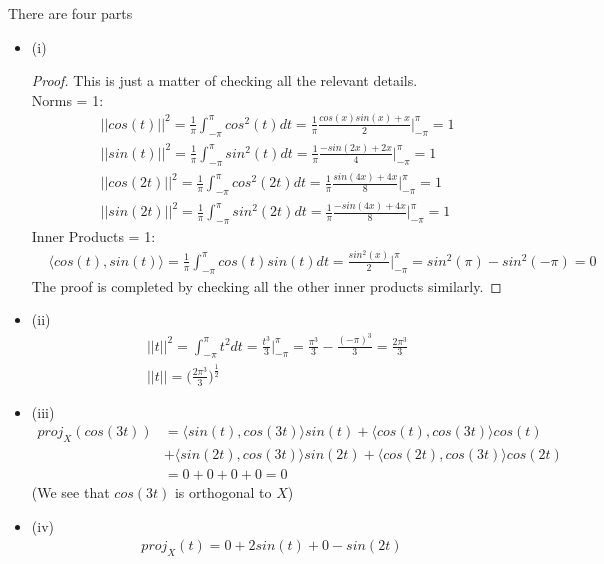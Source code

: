 \documentclass[12pt]{article}
\newenvironment{problem}[2][Problem]{\begin{trivlist}
\item[\hskip \labelsep {\bfseries #1}\hskip \labelsep {\bfseries #2.}]}{\end{trivlist}}
\theoremstyle{definition}
\theoremstyle{definition}
\theoremstyle{definition}
\theoremstyle{definition}
\begin{document}
\begin{problem}{3.8} There are four parts
\begin{itemize}
\item (i)
\begin{proof}
This is just a matter of checking all the relevant details. \\
Norms = 1:
\begin{align*}
&||cos(t)||^2 = \frac{1}{\pi} \int_{-\pi}^{\pi} cos^2(t) dt = \frac{1}{\pi}\frac{cos(x)sin(x) + x}{2} \big\vert^{\pi}_{-\pi} = 1 \\
&||sin(t)||^2 = \frac{1}{\pi} \int_{-\pi}^{\pi} sin^2(t) dt = \frac{1}{\pi}\frac{-sin(2x)+2x}{4} \big\vert^{\pi}_{-\pi} = 1 \\
&||cos(2t)||^2 = \frac{1}{\pi} \int_{-\pi}^{\pi} cos^2(2t) dt = \frac{1}{\pi}\frac{sin(4x)+4x}{8} \big\vert^{\pi}_{-\pi} = 1 \\
&||sin(2t)||^2 = \frac{1}{\pi} \int_{-\pi}^{\pi} sin^2(2t) dt = \frac{1}{\pi}\frac{-sin(4x)+4x}{8} \big\vert^{\pi}_{-\pi} = 1
\end{align*}
Inner Products = 1:
\begin{align*}
&\langle cos(t), sin(t) \rangle = \frac{1}{\pi} \int_{-\pi}^{\pi} cos(t)sin(t) dt = \frac{sin^2(x)}{2} \big\vert^{\pi}_{-\pi} = sin^2(\pi) - sin^2(-\pi) = 0 
\end{align*}
The proof is completed by checking all the other inner products similarly.
\end{proof}
\item (ii) 
\begin{align*}
&||t||^2 = \int_{-\pi}^{\pi} t^2 dt = \frac{t^3}{3} \big\vert^{\pi}_{-\pi} = \frac{\pi^3}{3} - \frac{(-\pi)^3}{3} = \frac{2\pi^3}{3} \\
&||t|| = \bigg( \frac{2\pi^3}{3} \bigg)^{\frac{1}{2}}
\end{align*}
\item(iii) 
\begin{align*}
proj_X(cos(3t)) &= \langle sin(t), cos(3t)\rangle sin(t) + \langle cos(t), cos(3t) \rangle cos(t) \\
&+ \langle sin(2t), cos(3t) \rangle sin(2t) + \langle cos(2t), cos(3t) \rangle cos(2t) \\
&= 0 + 0 + 0 + 0 = 0
\end{align*}
(We see that $cos(3t)$ is orthogonal to $X$)
\item (iv) 
\begin{align*}
proj_X(t) = 0 + 2sin(t) + 0 - sin(2t)
\end{align*}
\end{itemize}
\end{problem}
\end{document}
